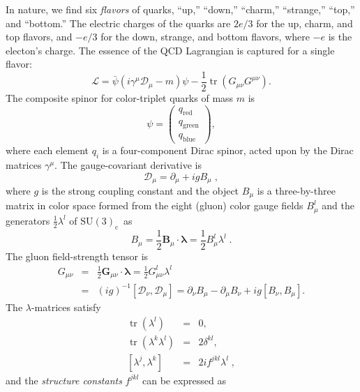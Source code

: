 \documentclass[prb,groupedaddress,nofootinbib,showpacs,twocolumn,floatfix]{revtex4}
\newcommand{\cfrac}[2]{{\textstyle \frac{#1}{#2}}}
\newcommand{\cgg}{\ensuremath{\mathrm{SU(3)}_{\mathrm{c}}}}
\newcommand{\D}{\ensuremath{\mathcal{D}}}
\newcommand{\tr}[1]{\mathop{\mathrm{tr}}#1}
\newcommand{\blambda}{\bm{\lambda}}
\begin{document}
In nature, we find six \emph{flavors} of quarks, ``up,'' ``down,'' 
``charm,'' ``strange,''  ``top,'' and ``bottom.''
The electric charges of the quarks are $2e/3$ for the up, charm, and top 
flavors, and $-e/3$ for the down, strange, and bottom flavors, where 
$-e$ is the electon's charge.
The essence of the QCD Lagrangian is captured for a single flavor:
\begin{equation}
	\mathcal{L} = \bar{\psi}(i \gamma^{\mu}\D_{\mu} -m)\psi -
	\cfrac{1}{2}\tr{(G_{\mu\nu}G^{\mu\nu})}.
	\label{eq:qcdlag}
\end{equation}
The composite spinor for color-triplet quarks of mass $m$ is
\begin{equation}
	\psi = \left( 
	\begin{array}{l}
	q_{\mathrm{red}} \\ q_{\mathrm{green}} \\ q_{\mathrm{blue}}
	\end{array}
	\right),
\end{equation}
where each element $q_i$ is a four-component Dirac spinor, acted upon 
by the Dirac matrices $\gamma^\mu$.
The gauge-covariant derivative is
\begin{equation}
\D_{\mu} = \partial_{\mu} + i g B_{\mu}\;,
\end{equation}
where $g$ is the strong coupling constant and the object $B_{\mu}$ is a
three-by-three matrix in color space formed from the eight (gluon)
color gauge fields $B^{l}_{\mu}$ and the generators 
$\cfrac{1}{2}\lambda^{l}$ of \cgg\ as
\begin{equation}
B_{\mu} = \cfrac{1}{2} \bm{B}_{\mu} \cdot \blambda  =
\cfrac{1}{2}B^{l}_{\mu}\lambda^{l}\;.
\end{equation}
The gluon field-strength tensor is
\begin{eqnarray}
G_{\mu\nu} & = & \cfrac{1}{2}\bm{G}_{\mu\nu} \cdot \blambda =
\cfrac{1}{2}G^{l}_{\mu\nu}\lambda^{l} \\
 & = & (ig)^{-1}\left[\D_{\nu},\D_{\mu}\right] = 
 \partial_{\nu}B_{\mu} - \partial_{\mu}B_{\nu} +
ig\left[B_{\nu},B_{\mu}\right].
 \nonumber
\end{eqnarray}
The $\lambda$-matrices satisfy
\begin{eqnarray}
\tr{(\lambda^{l})} & = & 0, \\
\tr{(\lambda^{k}\lambda^{l})} & = & 2\delta^{kl} ,\\
\left[\lambda^{j},\lambda^{k}\right] & = & 2if^{jkl}\lambda^{l}\;,
\end{eqnarray}
and the \emph{structure constants} $f^{jkl}$ can be expressed as
\end{document}
